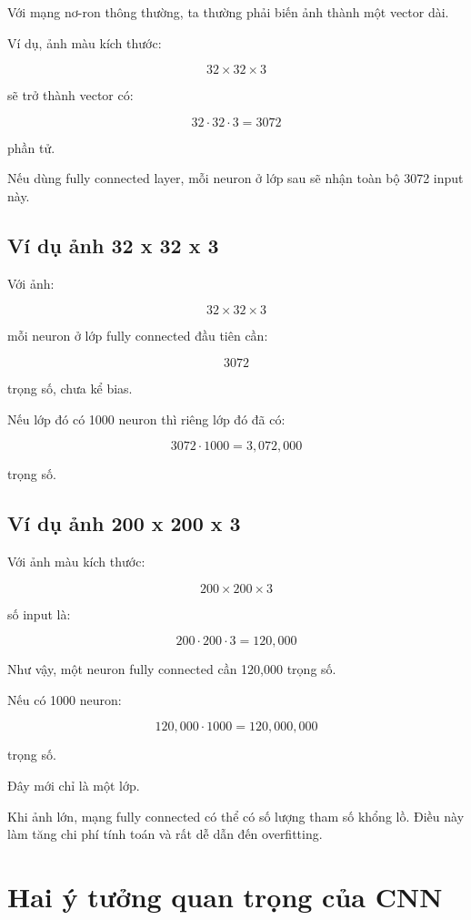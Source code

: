 \documentclass[12pt,a4paper]{report}
\begin{document}
Với mạng nơ-ron thông thường, ta thường phải biến ảnh thành một vector dài.

Ví dụ, ảnh màu kích thước:

\[
    32 \times 32 \times 3
\]

sẽ trở thành vector có:

\[
    32 \cdot 32 \cdot 3 = 3072
\]

phần tử.

Nếu dùng fully connected layer, mỗi neuron ở lớp sau sẽ nhận toàn bộ 3072 input này.

\section{Ví dụ ảnh 32 x 32 x 3}

Với ảnh:

\[
    32 \times 32 \times 3
\]

mỗi neuron ở lớp fully connected đầu tiên cần:

\[
    3072
\]

trọng số, chưa kể bias.

Nếu lớp đó có 1000 neuron thì riêng lớp đó đã có:

\[
    3072 \cdot 1000 = 3,072,000
\]

trọng số.

\section{Ví dụ ảnh 200 x 200 x 3}

Với ảnh màu kích thước:

\[
    200 \times 200 \times 3
\]

số input là:

\[
    200 \cdot 200 \cdot 3 = 120,000
\]

Như vậy, một neuron fully connected cần 120,000 trọng số.

Nếu có 1000 neuron:

\[
    120,000 \cdot 1000 = 120,000,000
\]

trọng số.

Đây mới chỉ là một lớp.

\begin{canhbao}
Khi ảnh lớn, mạng fully connected có thể có số lượng tham số khổng lồ. Điều này làm tăng chi phí tính toán và rất dễ dẫn đến overfitting.
\end{canhbao}

\chapter{Hai ý tưởng quan trọng của CNN}
\end{document}
